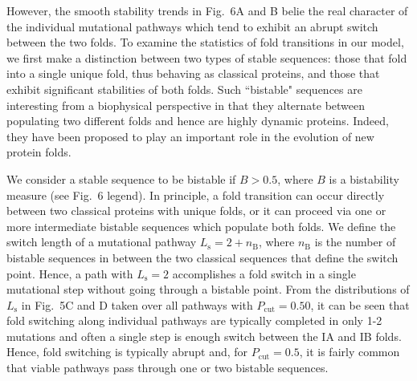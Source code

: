 \documentclass[
aip,
rsi,%
amsmath,amssymb,
reprint,%
]{revtex4-1}
\newcommand {\Pcut}     	{{P_\mathrm{cut}}}
\begin{document}

However, the smooth stability trends in Fig.~6A and B belie the real character of the individual mutational pathways which tend to exhibit an abrupt switch between the two folds. To examine the statistics of fold transitions in our model, we first make a distinction between two types of stable sequences: those that fold into a single unique fold, thus behaving as classical proteins, and those that exhibit significant stabilities of both folds. Such ``bistable" sequences are interesting from a biophysical perspective in that they alternate between populating two different folds and hence are highly dynamic proteins. Indeed, they have been proposed to play an important role in the evolution of new protein folds.~\cite{Sikosek2016} 

We consider a stable sequence to be bistable if $B>0.5$, where $B$ is a bistability measure (see Fig.~6 legend). In principle, a fold transition can occur directly between two classical proteins with unique folds, or it can proceed via one or more intermediate bistable sequences which populate both folds. We  define the switch length of a mutational pathway $L_\mathrm{s}=2+n_\mathrm{B}$, where $n_\mathrm{B}$ is the number of bistable sequences in between the two classical sequences that define the switch point. Hence, a path with $L_\mathrm{s}=2$ accomplishes a fold switch in a single mutational step without going through a bistable point. From the distributions of  $L_\mathrm{s}$ in Fig.~5C and D taken over all pathways with $\Pcut=0.50$, it can be seen that fold switching along individual pathways are typically completed in only 1-2 mutations and often a single step is enough switch between the IA and IB folds. Hence, fold switching is typically abrupt and, for $\Pcut = 0.5$, it is fairly common that viable pathways pass through one or two bistable sequences. 
\end{document}
